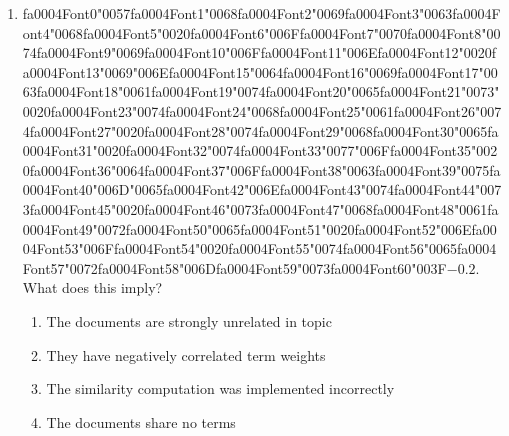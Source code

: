 \documentclass[12pt]{article}
\begin{document}
\begin{enumerate}[label=Q\arabic*.]
 \item {\csname fa0004Font0\endcsname\char"0057}{\csname fa0004Font1\endcsname\char"0068}{\csname fa0004Font2\endcsname\char"0069}{\csname fa0004Font3\endcsname\char"0063}{\csname fa0004Font4\endcsname\char"0068}{\csname fa0004Font5\endcsname\char"0020}{\csname fa0004Font6\endcsname\char"006F}{\csname fa0004Font7\endcsname\char"0070}{\csname fa0004Font8\endcsname\char"0074}{\csname fa0004Font9\endcsname\char"0069}{\csname fa0004Font10\endcsname\char"006F}{\csname fa0004Font11\endcsname\char"006E}{\csname fa0004Font12\endcsname\char"0020}{\csname fa0004Font13\endcsname\char"0069}{\char"006E}{\csname fa0004Font15\endcsname\char"0064}{\csname fa0004Font16\endcsname\char"0069}{\csname fa0004Font17\endcsname\char"0063}{\csname fa0004Font18\endcsname\char"0061}{\csname fa0004Font19\endcsname\char"0074}{\csname fa0004Font20\endcsname\char"0065}{\csname fa0004Font21\endcsname\char"0073}{\char"0020}{\csname fa0004Font23\endcsname\char"0074}{\csname fa0004Font24\endcsname\char"0068}{\csname fa0004Font25\endcsname\char"0061}{\csname fa0004Font26\endcsname\char"0074}{\csname fa0004Font27\endcsname\char"0020}{\csname fa0004Font28\endcsname\char"0074}{\csname fa0004Font29\endcsname\char"0068}{\csname fa0004Font30\endcsname\char"0065}{\csname fa0004Font31\endcsname\char"0020}{\csname fa0004Font32\endcsname\char"0074}{\csname fa0004Font33\endcsname\char"0077}{\char"006F}{\csname fa0004Font35\endcsname\char"0020}{\csname fa0004Font36\endcsname\char"0064}{\csname fa0004Font37\endcsname\char"006F}{\csname fa0004Font38\endcsname\char"0063}{\csname fa0004Font39\endcsname\char"0075}{\csname fa0004Font40\endcsname\char"006D}{\char"0065}{\csname fa0004Font42\endcsname\char"006E}{\csname fa0004Font43\endcsname\char"0074}{\csname fa0004Font44\endcsname\char"0073}{\csname fa0004Font45\endcsname\char"0020}{\csname fa0004Font46\endcsname\char"0073}{\csname fa0004Font47\endcsname\char"0068}{\csname fa0004Font48\endcsname\char"0061}{\csname fa0004Font49\endcsname\char"0072}{\csname fa0004Font50\endcsname\char"0065}{\csname fa0004Font51\endcsname\char"0020}{\csname fa0004Font52\endcsname\char"006E}{\csname fa0004Font53\endcsname\char"006F}{\csname fa0004Font54\endcsname\char"0020}{\csname fa0004Font55\endcsname\char"0074}{\csname fa0004Font56\endcsname\char"0065}{\csname fa0004Font57\endcsname\char"0072}{\csname fa0004Font58\endcsname\char"006D}{\csname fa0004Font59\endcsname\char"0073}{\csname fa0004Font60\endcsname\char"003F}$-0.2$. What does this imply?
 \begin{enumerate}[label=(\Alph*)]
     \item The documents are strongly unrelated in topic
     \item They have negatively correlated term weights
     \item The similarity computation was implemented incorrectly
     \item The documents share no terms
 \end{enumerate}
 

\end{enumerate}
\end{document}
